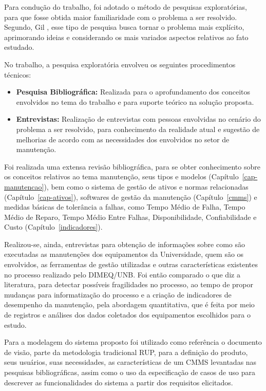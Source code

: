 Para condução do trabalho, foi adotado o método de pesquisas exploratórias, para que fosse obtida maior familiaridade com o problema a ser resolvido. Segundo, Gil \cite{gil2002elaborar}, esse tipo de pesquisa busca tornar o problema mais explícito, aprimorando ideias e considerando os mais variados aspectos relativos ao fato estudado. 

No trabalho, a pesquisa exploratória envolveu os seguintes procedimentos técnicos:

\begin{itemize}
\item \textbf{Pesquisa Bibliográfica:} Realizada para o aprofundamento dos conceitos envolvidos no tema do trabalho e para suporte teórico na solução proposta.
\item \textbf{Entrevistas:} Realização de entrevistas com pessoas envolvidas no cenário do problema a ser resolvido, para conhecimento da realidade atual  e sugestão de melhorias de acordo com as necessidades dos envolvidos no setor de manutenção.
\end{itemize}

Foi realizada uma extensa revisão bibliográfica, para se obter conhecimento sobre os conceitos relativos ao tema manutenção, seus tipos e modelos (Capítulo~\ref{cap-manutencao}), bem como o sistema de gestão de ativos e normas relacionadas (Capítulo~\ref{cap-ativos}), softwares de gestão da manutenção (Capítulo~\ref{cmms}) e medidas básicas de tolerância a falhas, como  Tempo Médio de Falha, Tempo Médio de Reparo, Tempo Médio Entre Falhas, Disponibilidade, Confiabilidade e Custo (Capítulo~\ref{indicadores}).

Realizou-se, ainda, entrevistas para obtenção de informações sobre como são executadas as manutenções dos equipamentos da Universidade, quem são os envolvidos, as ferramentas de gestão utilizadas e outras características existentes no processo realizado pelo DIMEQ/UNB. Foi então comparado o que diz a literatura, para detectar possíveis fragilidades no processo, ao tempo de propor mudanças para informatização do processo e a criação de indicadores de desempenho da manutenção, pela abordagem quantitativa, que é feita por meio de registros e análises dos dados coletados dos equipamentos escolhidos para o estudo. 

Para a modelagem do sistema proposto foi utilizado como referência o documento de visão, parte da metodologia tradicional RUP, para a definição do produto, seus usuários, suas necessidades, as características de um CMMS levantadas nas pesquisas bibliográficas, assim como o uso da especificação de casos de uso para descrever as funcionalidades do sistema a partir dos requisitos elicitados.

